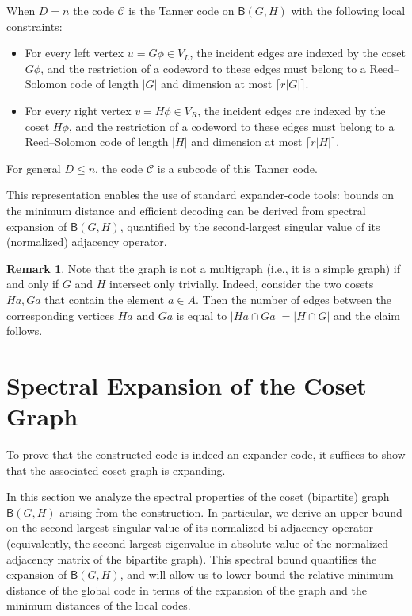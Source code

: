\documentclass[11pt]{article}
\theoremstyle{plain}
\theoremstyle{definition}
\newtheorem{remark}[theorem]{Remark}
\begin{document}
When $D = n$ the code $\mathcal{C}$ is the Tanner code on $\mathsf{B}(G,H)$ with the following local constraints:
\begin{itemize}
    \item For every left vertex $u=G\phi\in V_L$, the incident edges are indexed by the coset $G\phi$, and the restriction of a codeword to these edges must belong to a Reed--Solomon code of length $|G|$ and dimension at most $\lceil r|G|\rceil$.
  \item For every right vertex $v=H\phi\in V_R$, the incident edges are indexed by the coset $H\phi$, and the restriction of a codeword to these edges must belong to a Reed--Solomon code of length $|H|$ and dimension at most $\lceil r|H|\rceil$.
\end{itemize}
For general $D \leq n$, the code $\mathcal{C}$ is a subcode of this Tanner code.

This representation enables the use of standard expander-code tools: bounds on the minimum distance and efficient decoding can be derived from spectral expansion of $\mathsf{B}(G,H)$, quantified by the second-largest singular value of its (normalized) adjacency operator.

\begin{remark}
    
    Note that the graph is not a multigraph (i.e., it is a simple graph) if and only if $G$ and $H$ intersect only trivially. Indeed, consider the two cosets $Ha,Ga$ that contain the element $a\in A.$ Then the number of edges between the corresponding vertices $Ha$ and $Ga$ is equal to $|Ha\cap Ga|=|H\cap G|$ and the claim follows.  
\end{remark}








\section{Spectral Expansion of the Coset Graph}
\label{sec:graph-analysis}
To prove that the constructed code is indeed an expander code, it suffices to show that the associated coset graph is expanding.

In this section we analyze the spectral properties of the coset (bipartite) graph $\mathsf{B}(G,H)$ arising from the construction. In particular, we derive an upper bound on the second largest singular value of its normalized bi-adjacency operator (equivalently, the second largest eigenvalue in absolute value of the normalized adjacency matrix of the bipartite graph). This spectral bound quantifies the expansion of $\mathsf{B}(G,H)$, and will allow us to lower bound the relative minimum distance of the global code in terms of the expansion of the graph and the minimum distances of the local codes.
\end{document}
